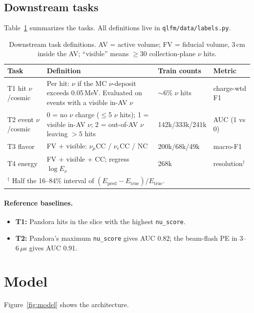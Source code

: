 \documentclass[11pt,a4paper]{article}
\newcommand{\nue}{\ensuremath{\nu_e}}
\newcommand{\numu}{\ensuremath{\nu_\mu}}
\newcommand{\code}[1]{\texttt{\small #1}}
\begin{document}
\subsection{Downstream tasks}
Table~\ref{tab:tasks} summarizes the tasks. All definitions live in \code{qlfm/data/labels.py}.

\begin{table}[h]
\centering\small
\caption{Downstream task definitions. AV = active volume; FV = fiducial volume, 3\,cm inside the AV; ``visible'' means $\ge 30$ collection-plane $\nu$ hits.}
\label{tab:tasks}
\begin{tabularx}{\textwidth}{l X l l}
\toprule
Task & Definition & Train counts & Metric \\
\midrule
T1 hit $\nu$/cosmic & Per hit: $\nu$ if the MC $\nu$-deposit exceeds 0.05\,MeV. Evaluated on events with a visible in-AV $\nu$ & $\sim$6\% $\nu$ hits & charge-wtd F1 \\
T2 event $\nu$/cosmic & 0 = no $\nu$ charge ($\le$5 $\nu$ hits); 1 = visible in-AV $\nu$; 2 = out-of-AV $\nu$ leaving $>5$ hits & 142k/333k/241k & AUC (1 vs 0) \\
T3 flavor & FV + visible: \numu CC / \nue CC / NC & 200k/68k/49k & macro-F1 \\
T4 energy & FV + visible + CC; regress $\log E_\nu$ & 268k & resolution$^\dagger$ \\
\bottomrule
\multicolumn{4}{l}{\footnotesize $^\dagger$ Half the 16--84\% interval of $(E_\mathrm{pred}-E_\mathrm{true})/E_\mathrm{true}$.}
\end{tabularx}
\end{table}

\paragraph{Reference baselines.}
\begin{itemize}
  \item \textbf{T1:} Pandora hits in the slice with the highest \code{nu\_score}.
  \item \textbf{T2:} Pandora's maximum \code{nu\_score} gives AUC 0.82; the beam-flash PE in 3--6\,$\mu$s gives AUC 0.91.
\end{itemize}

\section{Model}
Figure~\ref{fig:model} shows the architecture.
\end{document}
